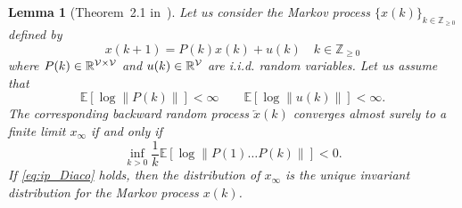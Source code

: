 \documentclass{IEEEtran}
\newtheorem{lemma}{Lemma}
\newcommand{\integernonnegative}{\mathbb{Z}_{\ge 0}}
\newcommand{\R}{\mathbb{R}} \newcommand{\N}{\mathbb{N}}  \newcommand{\Z}{\mathbb{Z}}
\def\Exp{\mathbb{E}}
\newcommand{\1}{\mathbf{1}} \newcommand{\ind}{\mathds{1}}
\begin{document}
\begin{lemma}[Theorem~2.1 in~\cite{PD-DF:99}]\label{Diaco}
Let us consider the Markov { {process}} $\{x(k)\}_{k\in\integernonnegative}$ defined by
$$x({k+1})={P(k)}x(k) + u(k)\quad k\in \integernonnegative$$ 
where $P(k)\in\R^{\V\times\V}$ and $u(k)\in\R^{\V}$ are i.i.d. random variables.
Let us assume that
\begin{equation}
\Exp[\log\|P(k)\|]<\infty\qquad
\Exp[\log\|u(k)\|]<\infty.
\end{equation}
The corresponding backward random process $\overleftarrow{x}(k)$ converges almost surely to a finite limit $x_{\infty}$ if and only if
\begin{equation}\label{eq:ip_Diaco}
\inf_{k>0}\frac{1}{k}\Exp\left[\log\|P(1)\ldots P(k)\|\right]<0.
\end{equation}
If \eqref{eq:ip_Diaco} holds, then the distribution of $x_{\infty}$ is the unique invariant distribution for the Markov process $x(k)$.
\end{lemma}
\end{document}
